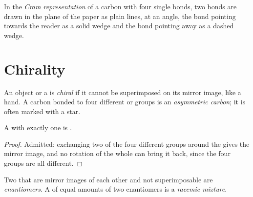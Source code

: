 \begin{definition}\label{def:g12:stereochemistry:cram}
In the \emph{Cram representation} of a carbon
 with four single bonds, two bonds are drawn in the plane of the
paper as plain lines, at an angle, the bond pointing towards the reader
as a solid wedge and the bond pointing away as a dashed wedge.
\end{definition}

\section{Chirality}

\begin{definition}\label{def:g12:stereochemistry:chiral}
An object or a  is \emph{chiral} if it cannot be
superimposed on its mirror image, like a hand. A carbon  bonded to
four different  or groups is an \emph{asymmetric
carbon}; it is often marked with a star.
\end{definition}

\begin{proposition}\label{prop:g12:stereochemistry:one-carbon}
A  with exactly one  is .
\end{proposition}

\begin{proof}
Admitted: exchanging two of the four different groups around the
 gives the mirror image, and no rotation of the whole
 can bring it back, since the four groups are all different.
\end{proof}

\begin{definition}\label{def:g12:stereochemistry:enantiomer}
Two  that are mirror images of each other and not
superimposable are \emph{enantiomers}. A  of
equal amounts of two enantiomers is a \emph{racemic
mixture}.
\end{definition}

